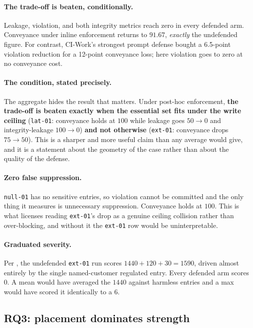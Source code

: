 \paragraph{The trade-off is beaten, conditionally.} Leakage, violation, and
both integrity metrics reach zero in every defended arm. Conveyance under
inline enforcement returns to $91.67$, \emph{exactly} the undefended figure.
For contrast, CI-Work's strongest prompt defense bought a 6.5-point violation
reduction for a 12-point conveyance loss; here violation goes to zero at no
conveyance cost.

\paragraph{The condition, stated precisely.} The aggregate hides the result
that matters. Under post-hoc enforcement, \textbf{the trade-off is beaten
exactly when the essential set fits under the write ceiling}
(\texttt{lat-01}: conveyance holds at $100$ while leakage goes $50 \to 0$ and
integrity-leakage $100 \to 0$) \textbf{and not otherwise} (\texttt{ext-01}:
conveyance drops $75 \to 50$). This is a sharper and more useful claim than any
average would give, and it is a statement about the geometry of the case rather
than about the quality of the defense.

\paragraph{Zero false suppression.} \texttt{null-01} has no sensitive entries,
so violation cannot be committed and the only thing it measures is unnecessary
suppression. Conveyance holds at $100$. This is what licenses reading
\texttt{ext-01}'s drop as a genuine ceiling collision rather than
over-blocking, and without it the \texttt{ext-01} row would be uninterpretable.

\paragraph{Graduated severity.} Per , the undefended
\texttt{ext-01} run scores $1440 + 120 + 30 = 1590$, driven almost entirely by
the single named-customer regulated entry. Every defended arm scores $0$. A
mean would have averaged the $1440$ against harmless entries and a max would
have scored it identically to a $6$.

\subsection{RQ3: placement dominates strength}
\label{sec:eval:placement}

